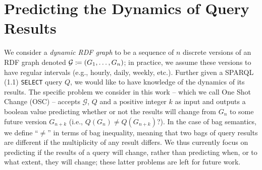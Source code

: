 \documentclass[runningheads]{llncs}
\newcommand{\da}{\ensuremath{:\nolinebreak\mkern-1.2mu\nolinebreak=}}
\begin{document}
%		
%		
%		
%		
%		
%		
%		
%		
%		
%
%	
%	
%	

\section{Predicting the Dynamics of Query Results}
\label{sec:approach}

We consider a \textit{dynamic RDF graph} to be a sequence of $n$ discrete versions of an RDF graph denoted $\mathcal{G} \da ( G_1, \ldots, G_n )$; in practice, we assume these versions to have regular intervals (e.g., hourly, daily, weekly, etc.). Further given a SPARQL (1.1) \texttt{SELECT} query $Q$, we would like to have knowledge of the dynamics of its results. The specific problem we consider in this work -- which we call One Shot Change (OSC) -- accepts $\mathcal{G}$, $Q$ and a positive integer $k$ as input and outputs a boolean value predicting whether or not the results will change from $G_n$ to some future version $G_{n+k}$ (i.e., $Q(G_n) \neq Q(G_{n+k})$?). In the case of bag semantics, we define ``$\neq$'' in terms of bag inequality, meaning that two bags of query results are different if the multiplicity of any result differs. We thus currently focus on predicting if the results of a query will change, rather than predicting when, or to what extent, they will change; these latter problems are left for future work.
\end{document}
